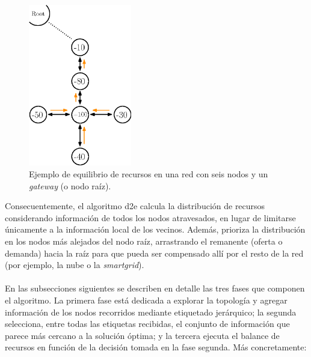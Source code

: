 \begin{figure}[ht!]
    \centering
    \includegraphics[width=0.4\textwidth]{fig/05_den2ne/den2ne_02.eps}
    \caption{Ejemplo de equilibrio de recursos en una red con seis nodos y un \textit{gateway} (o nodo raíz).}
    \label{fig:den2ne_02}
\end{figure}

Consecuentemente, el algoritmo \gls{d2e} calcula la distribución de recursos considerando información de todos los nodos atravesados, en lugar de limitarse únicamente a la información local de los vecinos. Además, prioriza la distribución en los nodos más alejados del nodo raíz, arrastrando el remanente (oferta o demanda) hacia la raíz para que pueda ser compensado allí por el resto de la red (por ejemplo, la nube o la \textit{smartgrid}).\\
\\
En las subsecciones siguientes se describen en detalle las tres fases que componen el algoritmo. La primera fase está dedicada a explorar la topología y agregar información de los nodos recorridos mediante etiquetado jerárquico; la segunda selecciona, entre todas las etiquetas recibidas, el conjunto de información que parece más cercano a la solución óptima; y la tercera ejecuta el balance de recursos en función de la decisión tomada en la fase segunda. Más concretamente:

